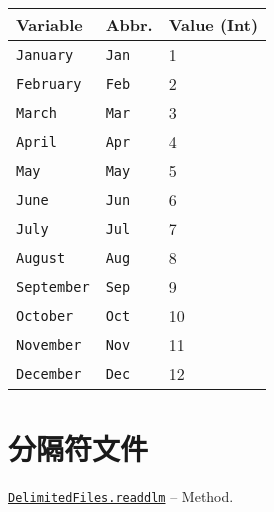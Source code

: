 \begin{table}[h]

\begin{tabulary}{\linewidth}{|L|L|L|}
\hline
Variable & Abbr. & Value (Int) \\
\hline
\texttt{January} & \texttt{Jan} & 1 \\
\hline
\texttt{February} & \texttt{Feb} & 2 \\
\hline
\texttt{March} & \texttt{Mar} & 3 \\
\hline
\texttt{April} & \texttt{Apr} & 4 \\
\hline
\texttt{May} & \texttt{May} & 5 \\
\hline
\texttt{June} & \texttt{Jun} & 6 \\
\hline
\texttt{July} & \texttt{Jul} & 7 \\
\hline
\texttt{August} & \texttt{Aug} & 8 \\
\hline
\texttt{September} & \texttt{Sep} & 9 \\
\hline
\texttt{October} & \texttt{Oct} & 10 \\
\hline
\texttt{November} & \texttt{Nov} & 11 \\
\hline
\texttt{December} & \texttt{Dec} & 12 \\
\hline
\end{tabulary}

\end{table}





\hypertarget{8991044554794555328}{}


\chapter{分隔符文件}


\hypertarget{16037077475059757878}{} 
\hyperlink{16037077475059757878}{\texttt{DelimitedFiles.readdlm}}  -- {Method.}

